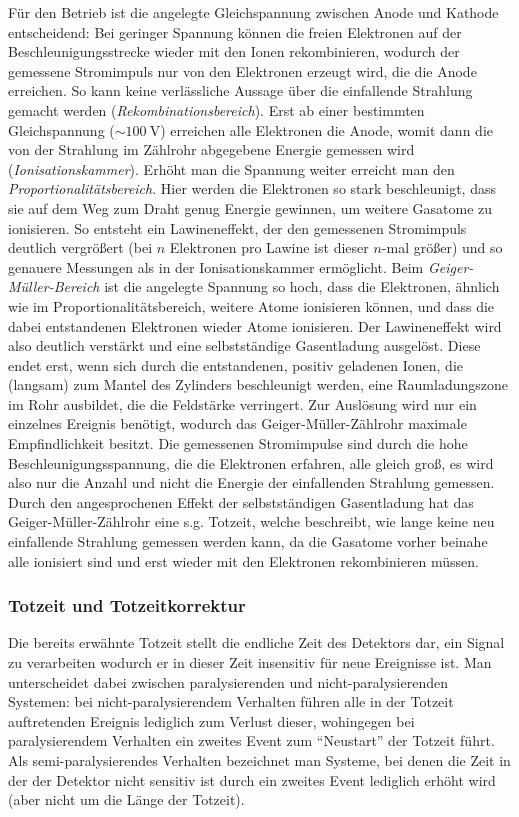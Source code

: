 \documentclass[11pt, a4paper]{article}
\numberwithin{equation}{section}
\begin{document}
Für den Betrieb ist die angelegte Gleichspannung zwischen Anode und Kathode entscheidend:
Bei geringer Spannung können die freien Elektronen auf der Beschleunigungsstrecke wieder mit den Ionen rekombinieren, wodurch der gemessene Stromimpuls nur von den Elektronen erzeugt wird, die die Anode erreichen.
So kann keine verlässliche Aussage über die einfallende Strahlung gemacht werden (\emph{Rekombinationsbereich}).
Erst ab einer bestimmten Gleichspannung ($\sim \SI{100}{\volt}$) erreichen alle Elektronen die Anode, womit dann die von der Strahlung im Zählrohr abgegebene Energie gemessen wird (\emph{Ionisationskammer}).
Erhöht man die Spannung weiter erreicht man den \emph{Proportionalitätsbereich}.
Hier werden die Elektronen so stark beschleunigt, dass sie auf dem Weg zum Draht genug Energie gewinnen, um weitere Gasatome zu ionisieren.
So entsteht ein Lawineneffekt, der den gemessenen Stromimpuls deutlich vergrößert (bei $n$ Elektronen pro Lawine ist dieser $n$-mal größer) und so genauere Messungen als in der Ionisationskammer ermöglicht.
Beim \emph{Geiger-Müller-Bereich} ist die angelegte Spannung so hoch, dass die Elektronen, ähnlich wie im Proportionalitätsbereich, weitere Atome ionisieren können, und dass die dabei entstandenen Elektronen wieder Atome ionisieren.
Der Lawineneffekt wird also deutlich verstärkt und eine selbstständige Gasentladung ausgelöst.
Diese endet erst, wenn sich durch die entstandenen, positiv geladenen Ionen, die (langsam) zum Mantel des Zylinders beschleunigt werden, eine Raumladungszone im Rohr ausbildet, die die Feldstärke verringert.
Zur Auslösung wird nur ein einzelnes Ereignis benötigt, wodurch das Geiger-Müller-Zählrohr maximale Empfindlichkeit besitzt.
Die gemessenen Stromimpulse sind durch die hohe Beschleunigungsspannung, die die Elektronen erfahren, alle gleich groß, es wird also nur die Anzahl und nicht die Energie der einfallenden Strahlung gemessen.
Durch den angesprochenen Effekt der selbstständigen Gasentladung hat das Geiger-Müller-Zählrohr eine s.g. Totzeit, welche beschreibt, wie lange keine neu einfallende Strahlung gemessen werden kann, da die Gasatome vorher beinahe alle ionisiert sind und erst wieder mit den Elektronen rekombinieren müssen.

\subsubsection{Totzeit und Totzeitkorrektur}
Die bereits erwähnte Totzeit stellt die endliche Zeit des Detektors dar, ein Signal zu verarbeiten wodurch er in dieser Zeit insensitiv für neue Ereignisse ist.
Man unterscheidet dabei zwischen paralysierenden und nicht-paralysierenden Systemen:
bei nicht-paralysierendem Verhalten führen alle in der Totzeit auftretenden Ereignis lediglich zum Verlust dieser, wohingegen bei paralysierendem Verhalten ein zweites Event zum "`Neustart"' der Totzeit führt.
Als semi-paralysierendes Verhalten bezeichnet man Systeme, bei denen die Zeit in der der Detektor nicht sensitiv ist durch ein zweites Event lediglich erhöht wird (aber nicht um die Länge der Totzeit).
\end{document}
